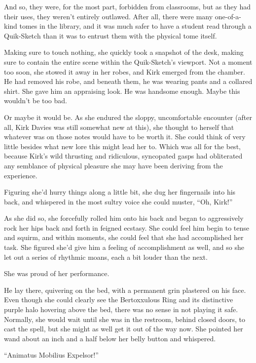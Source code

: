 And so, they were, for the most part, forbidden from classrooms, but as they had their uses, they weren’t entirely outlawed. After all, there were many one-of-a-kind tomes in the library, and it was much safer to have a student read through a Quik-Sketch than it was to entrust them with the physical tome itself.

Making sure to touch nothing, she quickly took a snapshot of the desk, making sure to contain the entire scene within the Quik-Sketch’s viewport. Not a moment too soon, she stowed it away in her robes, and Kirk emerged from the chamber. He had removed his robe, and beneath them, he was wearing pants and a collared shirt. She gave him an appraising look. He was handsome enough. Maybe this wouldn’t be too bad.

Or maybe it would be. As she endured the sloppy, uncomfortable encounter (after all, Kirk Davies was still somewhat new at this), she thought to herself that whatever was on those notes would have to be worth it. She could think of very little besides what new lore this might lead her to. Which was all for the best, because Kirk’s wild thrusting and ridiculous, syncopated gasps had obliterated any semblance of physical pleasure she may have been deriving from the experience.

Figuring she’d hurry things along a little bit, she dug her fingernails into his back, and whispered in the most sultry voice she could muster, “Oh, Kirk!”

As she did so, she forcefully rolled him onto his back and began to aggressively rock her hips back and forth in feigned ecstasy. She could feel him begin to tense and squirm, and within moments, she could feel that she had accomplished her task. She figured she’d give him a feeling of accomplishment as well, and so she let out a series of rhythmic moans, each a bit louder than the next.

She was proud of her performance.

He lay there, quivering on the bed, with a permanent grin plastered on his face. Even though she could clearly see the Bertoxxulous Ring and its distinctive purple halo hovering above the bed, there was no sense in not playing it safe. Normally, she would wait until she was in the restroom, behind closed doors, to cast the spell, but she might as well get it out of the way now. She pointed her wand about an inch and a half below her belly button and whispered.

“Animatus Mobilius Expelsor!”

